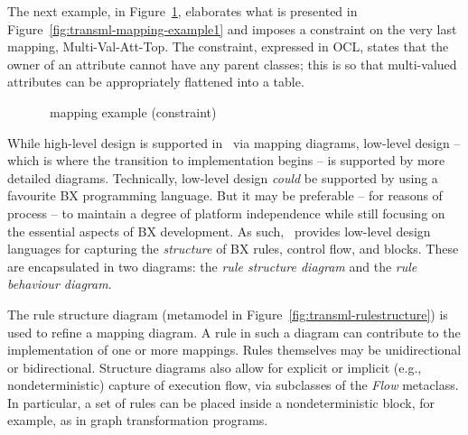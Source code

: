 The next example, in Figure~\ref{fig:mapping-example3}, elaborates what is presented in Figure~\ref{fig:transml-mapping-example1} and imposes a constraint on the very last mapping, Multi-Val-Att-Top. The constraint, expressed in OCL, states that the owner of an attribute cannot have any parent classes; this is so that multi-valued attributes can be appropriately flattened into a table.

\begin{figure}[htbp]
\caption{\transml\ mapping example (constraint) \cite{GuerraLKPS13}}
\label{fig:mapping-example3}
\end{figure}

While high-level design is supported in \transml\ via mapping diagrams, low-level design -- which is where the transition to implementation begins -- is
supported by more detailed diagrams. Technically, low-level design \textit{could} be supported by using a favourite BX programming language. But it may be preferable -- for reasons of process -- to maintain a degree of platform independence while still focusing on the essential aspects of BX development. As such, \transml\ provides low-level design languages for capturing the \textit{structure} of BX rules, control flow, and blocks. These are encapsulated in two diagrams: the \textit{rule structure diagram} and the \textit{rule behaviour diagram}.

The rule structure diagram (metamodel in Figure~\ref{fig:transml-rulestructure}) is used to refine a mapping diagram. A rule in such a diagram can contribute to the implementation of one or more mappings. Rules themselves may be unidirectional or bidirectional. Structure diagrams also allow for explicit or implicit (e.g., nondeterministic) capture of execution flow, via subclasses of the \textit{Flow} metaclass. In particular, a set of rules can be placed inside a nondeterministic block, for example, as in graph transformation programs.

